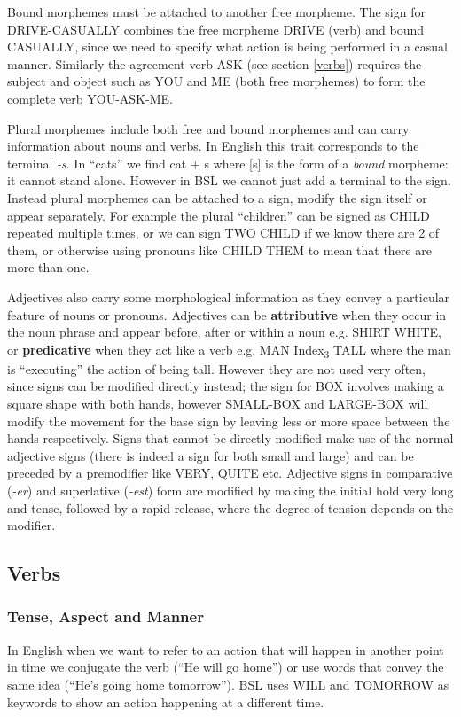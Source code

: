 \documentclass[12pt]{ociamthesis}  %
\begin{document}
Bound morphemes must be attached to another free morpheme. The sign for DRIVE-CASUALLY combines the free morpheme DRIVE (verb) and bound CASUALLY, since we need to specify what action is being performed in a casual manner. Similarly the agreement verb ASK (see section \ref{verbs}) requires the subject and object such as YOU and ME (both free morphemes) to form the complete verb YOU-ASK-ME.

Plural morphemes include both free and bound morphemes and can carry information about nouns and verbs. In English this trait corresponds to the terminal \textit{-s}. In ``cats'' we find cat + s where [s] is the form of a \textit{bound} morpheme: it cannot stand alone. However in BSL we cannot just add a terminal to the sign. Instead plural morphemes can be attached to a sign, modify the sign itself or appear separately. For example the plural ``children'' can be signed as CHILD repeated multiple times, or we can  sign TWO CHILD if we know there are 2 of them, or otherwise using pronouns like CHILD THEM to mean that there are more than one.

Adjectives also carry some morphological information as they convey a particular feature of nouns or pronouns. Adjectives can be \textbf{attributive} when they occur in the noun phrase and appear before, after or within a noun e.g. SHIRT WHITE, or \textbf{predicative} when they act like a verb e.g. MAN Index\textsubscript{3} TALL where the man is ``executing'' the action of being tall. However they are not used very often, since signs can be modified directly instead; the sign for BOX involves making a square shape with both hands, however SMALL-BOX and LARGE-BOX will modify the movement for the base sign by leaving less or more space between the hands respectively. Signs that cannot be directly modified make use of the normal adjective signs (there is indeed a sign for both small and large) and can be preceded by a premodifier like VERY, QUITE etc. Adjective signs in comparative (\textit{-er}) and superlative (\textit{-est}) form are modified by making the initial hold very long and tense, followed by a rapid release, where the degree of tension depends on the modifier.

\subsection{Verbs}
\subsubsection{Tense, Aspect and Manner}
In English when we want to refer to an action that will happen in another point in time we conjugate the verb (``He will go home'') or use words that convey the same idea (``He's going home tomorrow''). BSL uses WILL and TOMORROW as keywords to show an action happening at a different time.
\end{document}
